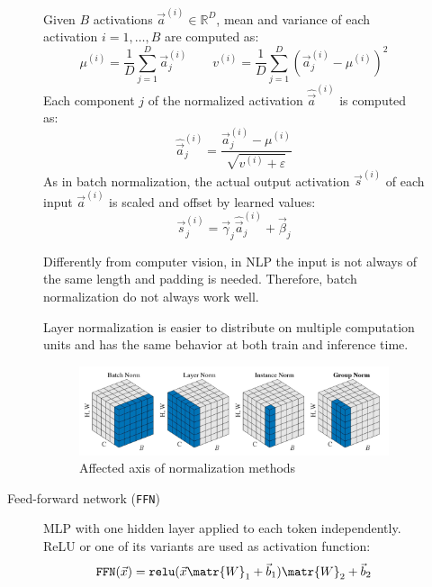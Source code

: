 \begin{description}
\begin{description}
                Given $B$ activations $\vec{a}^{(i)} \in \mathbb{R}^{D}$, mean and variance of each activation $i=1, \dots, B$ are computed as:
                \[ \mu^{(i)} = \frac{1}{D} \sum_{j=1}^{D} \vec{a}^{(i)}_{j} \qquad v^{(i)} = \frac{1}{D} \sum_{j=1}^{D} \left( \vec{a}^{(i)}_j - \mu^{(i)} \right)^2 \]
                Each component $j$ of the normalized activation $\hat{\vec{a}}^{(i)}$ is computed as:
                \[ \hat{\vec{a}}^{(i)}_{j} = \frac{\vec{a}^{(i)}_j - \mu^{(i)}}{\sqrt{v^{(i)} + \varepsilon}} \]
                As in batch normalization, the actual output activation $\vec{s}^{(i)}$ of each input $\vec{a}^{(i)}$ is scaled and offset by learned values:
                \[ \vec{s}^{(i)}_j = \vec{\gamma}_j \hat{\vec{a}}^{(i)}_j + \vec{\beta}_j \]

                \begin{remark}
                    Differently from computer vision, in NLP the input is not always of the same length and padding is needed. Therefore, batch normalization do not always work well.
                \end{remark}

                \begin{remark}
                    Layer normalization is easier to distribute on multiple computation units and has the same behavior at both train and inference time.
                \end{remark}

                \begin{figure}[H]
                    \centering
                    \includegraphics[width=0.8\linewidth]{./img/norm_methods.jpg}
                    \caption{Affected axis of normalization methods}
                \end{figure}

            \item[Feed-forward network (\texttt{FFN})] 
                MLP with one hidden layer applied to each token independently. ReLU or one of its variants are used as activation function:
                \[ \texttt{FFN}(\vec{x}) = \texttt{relu}(\vec{x}\matr{W}_1 + \vec{b}_1)\matr{W}_2 + \vec{b}_2 \]


\end{description}
\end{description}
